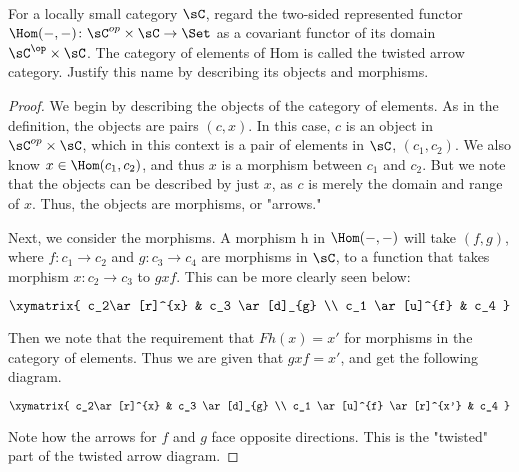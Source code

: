 \documentclass[../../main]{subfiles}
\begin{document}
\paragraph{}

\begin{exercise}
For a locally small category $\sC$, regard the two-sided represented functor
$\Hom(-,-)\colon \sC^{op} \times \sC \rightarrow \Set$ as a covariant functor of its
domain $\sC^{\op} \times \sC$.  The category of elements of Hom is called the
twisted arrow category.  Justify this name by describing its objects and
morphisms.
\end{exercise}

\begin{proof}
We begin by describing the objects of the category of elements.  As in the
definition, the objects are pairs $(c,x)$.  In this case, $c$ is an object in
$\sC^{op} \times \sC$, which in this context is a pair of elements in $\sC$,
$(c_1,c_2)$.  We also know $x \in \Hom(c_1,c_2)$, and thus $x$ is a morphism
between $c_1$ and $c_2$.  But we note that the objects can be described by just
$x$, as $c$ is merely the domain and range of $x$.  Thus, the objects are
morphisms, or "arrows."

Next, we consider the morphisms.  A morphism h in $\Hom(-,-)$ will take
$(f,g)$, where $f\colon c_1 \rightarrow c_2$ and $g\colon c_3 \rightarrow c_4$ are
morphisms in $\sC$, to a function that takes morphism $x\colon c_2 \rightarrow c_3$
to $gxf$.  This can be more clearly seen below:

$\xymatrix{ c_2\ar[r]^{x} & c_3 \ar[d]_{g} \\ c_1 \ar[u]^{f}  & c_4 }\\$ 

Then we note that the requirement that $Fh(x) = x'$ for morphisms in the category of elements.  Thus we are given that $gxf = x'$, and get the following diagram.

$\xymatrix{ c_2\ar[r]^{x} & c_3 \ar[d]_{g} \\ c_1 \ar[u]^{f} \ar[r]^{x'}  & c_4 }\\$ 

Note how the arrows for $f$ and $g$ face opposite directions.  This is the "twisted" part of the twisted arrow diagram.
\end{proof}
\end{document}
